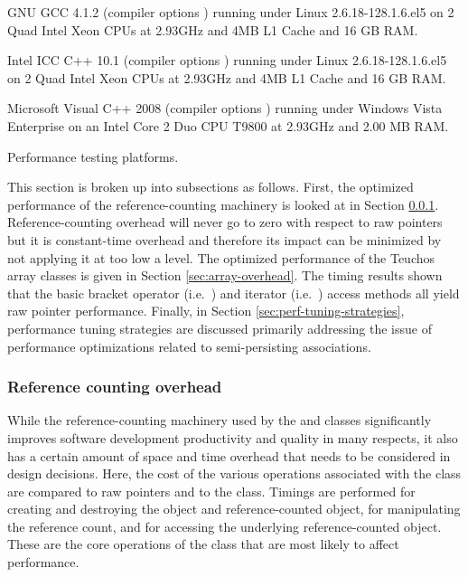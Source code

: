 \documentclass[pdf,ps2pdf,11pt]{SANDreport}
\begin{document}
\begin{table}
\begin{description}
%
{}\item[GCC 4.1.2:] GNU GCC 4.1.2 (compiler options {}) running under Linux 2.6.18-128.1.6.el5
on 2 Quad Intel Xeon CPUs at 2.93GHz and 4MB L1 Cache and 16 GB RAM.
%
{}\item[ICC 10.1:] Intel ICC C++ 10.1 (compiler options {}) running under Linux 2.6.18-128.1.6.el5
on 2 Quad Intel Xeon CPUs at 2.93GHz and 4MB L1 Cache and 16 GB RAM.
%
{}\item[MSVC++ 2008:] Microsoft Visual C++ 2008 (compiler options
{})
running under Windows Vista Enterprise on an Intel Core 2 Duo CPU
T9800 at 2.93GHz and 2.00 MB RAM.
%
\end{description}
\caption{\label{tbl:PerfTestPlatforms}
Performance testing platforms.}
\end{table}

This section is broken up into subsections as follows.  First, the
optimized performance of the reference-counting machinery is looked at
in Section {}\ref{sec:reference-counting-overhead}.
Reference-counting overhead will never go to zero with respect to raw
pointers but it is constant-time overhead and therefore its impact can
be minimized by not applying it at too low a level.  The optimized
performance of the Teuchos array classes is given in Section
{}\ref{sec:array-overhead}.  The timing results shown that the basic
bracket operator (i.e.\ {}) and iterator (i.e.\
{}) access methods all yield raw pointer performance.
Finally, in Section {}\ref{sec:perf-tuning-strategies}, performance
tuning strategies are discussed primarily addressing the issue of
performance optimizations related to semi-persisting associations.


%
{}\subsubsection{Reference counting overhead}
\label{sec:reference-counting-overhead}
%

While the reference-counting machinery used by the {} and
{}\ttt{ArrayRCP} classes significantly improves software
development productivity and quality in many respects, it also has a
certain amount of space and time overhead that needs to be considered
in design decisions.  Here, the cost of the various operations
associated with the {} class are compared to raw pointers
and to the {}\ttt{boost::shared\_ptr} class.  Timings are performed
for creating and destroying the {}\ttt{RCPNode} object and
reference-counted object, for manipulating the reference count, and
for accessing the underlying reference-counted object.  These are the
core operations of the {}\ttt{RCP} class that are most likely to
affect performance.
\end{document}
